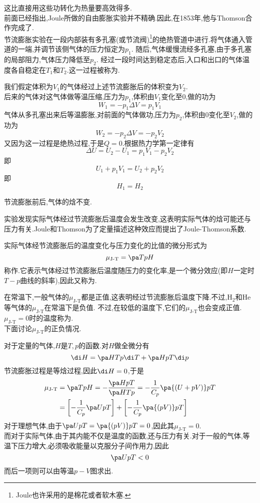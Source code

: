 \documentclass{ctexart}
\begin{document}
这比直接用这些功转化为热量要高效得多.\vspace{12pt}\\
\indent 前面已经指出,Joule所做的自由膨胀实验并不精确.因此,在1853年,他与Thomson合作完成了.\\
\indent 节流膨胀实验在一段内部装有多孔塞(或节流阀)\footnote{Joule也许采用的是棉花或者软木塞.}的绝热管道中进行.将气体通入管道的一端,并调节该侧气体的压力恒定为$p_1$.%
随后,气体缓慢流经多孔塞,由于多孔塞的局部阻力,气体压力降低至$p_2$.%
经过一段时间达到稳定态后,入口和出口的气体温度各自稳定在$T_1$和$T_2$.这一过程被称为.
\begin{derivation}
    我们假定体积为$V_1$的气体经过上述节流膨胀后的体积变为$V_2$.\\
    后来的气体对这气体做等温压缩,压力为$p_1$,体积由$V_1$变化至$0$,做的功为
    \[W_1=-p_1\Delta V=p_1V_1\]
    气体从多孔塞出来后等温膨胀,对前面的气体做功,压力为$p_2$,体积由$0$变化至$V_2$,做的功为
    \[W_2=-p_2\Delta V=-p_2V_2\]
    又因为这一过程是绝热过程,于是$Q=0$.根据热力学第一定律有
    \[\Delta U=U_2-U_1=p_1V_1-p_2V_2\]
    即
    \[U_1+p_1V_1=U_2+p_2V_2\]
    即
    \[H_1=H_2\]

\end{derivation}
\begin{theorem}[2C.3.1 节流膨胀过程]
    节流膨胀前后,气体的焓不变.
\end{theorem}
实验发现实际气体经过节流膨胀后温度会发生改变,这表明实际气体的焓可能还与压力有关.Joule和Thomson为了定量描述这种效应而提出了Joule-Thomson系数.
\begin{definition}
    实际气体经节流膨胀后的温度变化与压力变化的比值的微分形式为
    \[\mu_{\text{J-T}}=\pa TpH\]
    称作.它表示气体经过节流膨胀后温度随压力的变化率,是一个微分效应(即$H$一定时$T-p$曲线的斜率),因此又称为.
\end{definition}
在常温下,一般气体的$\mu_{\text{J-T}}$都是正值,这表明经过节流膨胀后温度下降.不过,H$_2$和He等气体的$\mu_{\text {J-T}}$在常温下是负值.%
不过,在较低的温度下,它们的$\mu_{\text{J-T}}$也会变成正值.$\mu_{\text{J-T}}=0$时的温度称为.\\
\indent 下面讨论$\mu_{\text{J-T}}$的正负情况.
\begin{derivation}
    对于定量的气体,$H$是$T,p$的函数.对$H$做全微分有
    \[\di H=\pa HTp\di T+\pa HpT\di p\]
    节流膨胀过程是等焓过程,因此$\di H=0$,于是
    \[\begin{aligned}
        \mu_{\text{J-T}}
        &= \pa TpH = -\dfrac{\pa HpT}{\pa HTp} = -\dfrac{1}{C_p}\pa{(U+pV)}pT \\
        &= \left[-\dfrac1{C_p}\pa UpT\right]+\left[-\dfrac1{C_p}\pa{(pV)}pT\right]
    \end{aligned}\]
    对于理想气体,由于$\displaystyle\pa UpT=\pa{(pV)}pT=0$,因此其$\mu_{\text{J-T}}=0$.\\
    而对于实际气体,由于其内能不仅是温度的函数,还与压力有关.对于一般的气体,等温下压力增大,必须吸收能量以克服分子间作用力,因此
    \[\pa UpT<0\]
    而后一项则可以由等温$p-V$图求出.
\end{derivation}
\end{document}
